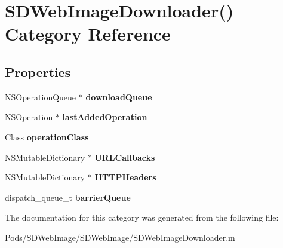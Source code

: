 \hypertarget{category_s_d_web_image_downloader_07_08}{}\section{S\+D\+Web\+Image\+Downloader() Category Reference}
\label{category_s_d_web_image_downloader_07_08}
\subsection*{Properties}
\begin{DoxyCompactItemize}
\item 
\mbox{\label{category_s_d_web_image_downloader_07_08_a90b193308b6aa04efb61af2f968a0638}} 
N\+S\+Operation\+Queue $\ast$ {\bfseries download\+Queue}
\item 
\mbox{\label{category_s_d_web_image_downloader_07_08_a28e4e8d6db9c6182abe42716ec123285}} 
N\+S\+Operation $\ast$ {\bfseries last\+Added\+Operation}
\item 
\mbox{\label{category_s_d_web_image_downloader_07_08_a170369ea938fa4d6b908a618249f6659}} 
Class {\bfseries operation\+Class}
\item 
\mbox{\label{category_s_d_web_image_downloader_07_08_a1825d988a26a66fcf85720f6feb0bbf1}} 
N\+S\+Mutable\+Dictionary $\ast$ {\bfseries U\+R\+L\+Callbacks}
\item 
\mbox{\label{category_s_d_web_image_downloader_07_08_ad0fc833f6b66129357e4fef18bb74b07}} 
N\+S\+Mutable\+Dictionary $\ast$ {\bfseries H\+T\+T\+P\+Headers}
\item 
\mbox{\label{category_s_d_web_image_downloader_07_08_a599eea6513973b0838bbf18a43a27876}} 
dispatch\+\_\+queue\+\_\+t {\bfseries barrier\+Queue}
\end{DoxyCompactItemize}


The documentation for this category was generated from the following file\+:\begin{DoxyCompactItemize}
\item 
Pods/\+S\+D\+Web\+Image/\+S\+D\+Web\+Image/S\+D\+Web\+Image\+Downloader.\+m\end{DoxyCompactItemize}
